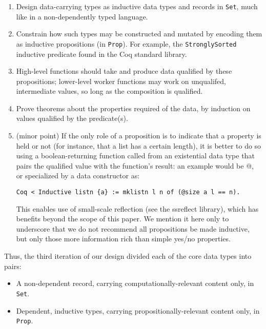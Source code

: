 \documentclass{llncs}
\begin{document}
\begin{enumerate}
\item Design data-carrying types as inductive data types and records in
  \texttt{Set}, much like in a non-dependently typed language.

\item Constrain how such types may be constructed and mutated by encoding them
  as inductive propositions (in \texttt{Prop}).  For example, the
  \texttt{StronglySorted} inductive predicate found in the Coq standard
  library.

\item High-level functions should take and produce data qualified by these
  propositions; lower-level worker functions may work on unqualifed,
  intermediate values, so long as the composition is qualified.

\item Prove theorems about the properties required of the data, by induction
  on values qualified by the predicate(s).

\item (minor point) If the only role of a proposition is to indicate
  that a property is held or not (for instance, that a list has a
  certain length), it is better to do so using a boolean-returning
  function called from an existential data type that pairs the
  qualified value with the function's result: an example would be
  @, or specialized by a data
  constructor as:

\begin{flushleft}
\texttt{Coq~{<}~Inductive~listn~\{a\}~:=~mklistn~l~n~of~(@size~a~l~==~n).}\\
\end{flushleft}
  
  This enables use of small-scale reflection (see the \textsf{ssreflect}
  library), which has benefits beyond the scope of this paper.  We mention it
  here only to underscore that we do not recommend all propositions be made
  inductive, but only those more information rich than simple yes/no properties.

\end{enumerate}

Thus, the third iteration of our design divided each of the core data types
into pairs:

\begin{itemize}
\item A non-dependent record, carrying computationally-relevant content only,
  in \texttt{Set}.

\item Dependent, inductive types, carrying propositionally-relevant content
  only, in \texttt{Prop}.
\end{itemize}
\end{document}
